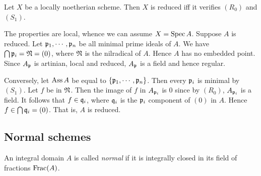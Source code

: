     \begin{example}\label{eg: R-S criterion of reducedness}
        Let $X$ be a locally noetherian scheme.
        Then $X$ is reduced iff it verifies $(R_0)$ and $(S_1)$.

        The properties are local, whence we can assume $X=\operatorname{Spec} A$.
        Suppose $A$ is reduced.
        Let ${\mathfrak{p}}_1,\cdots,{\mathfrak{p}}_n$ be all minimal prime ideals of $A$.
        We have $\bigcap {\mathfrak{p}}_i = {\mathfrak{N}} = (0)$, where ${\mathfrak{N}}$ is the nilradical of $A$.
        Hence $A$ has no embedded point.
        Since $A_{\mathfrak{p}}$ is artinian, local and reduced, $A_{\mathfrak{p}}$ is a field and hence regular.
        
        Conversely, let $\operatorname{Ass} A$ be equal to $\{{\mathfrak{p}}_1,\cdots,{\mathfrak{p}}_n\}$.
        Then every ${\mathfrak{p}}_i$ is minimal by $(S_1)$.
        Let $f$ be in ${\mathfrak{N}}$.
        Then the image of $f$ in $A_{{\mathfrak{p}}_i}$ is $0$ since by $(R_0)$, $A_{{\mathfrak{p}}_i}$ is a field.
        It follows that $f \in {\mathfrak{q}}_i$, where ${\mathfrak{q}}_i$ is the ${\mathfrak{p}}_i$ component of $(0)$ in $A$.
        Hence $f \in \bigcap {\mathfrak{q}}_i = (0)$.
        That is, $A$ is reduced.
    \end{example}




\subsection{Normal schemes }


    \begin{definition}\label{def: normal domain}
        An integral domain $A$ is called \textit{normal} if it is integrally closed in its field of fractions $\operatorname{Frac}(A)$.
    \end{definition}

